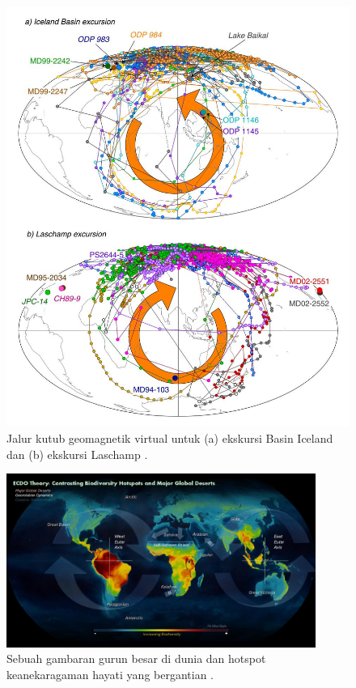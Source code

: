 \documentclass[10pt,twocolumn,letterpaper]{article}
\begin{document}
\begin{figure}[b]
\begin{center}
   \includegraphics[width=0.95\linewidth]{laj.jpg}
\end{center}
   \caption{Jalur kutub geomagnetik virtual untuk (a) ekskursi Basin Iceland dan (b) ekskursi Laschamp \cite{35}.}
\label{fig:7}
\label{fig:onecol}
\end{figure}

\begin{figure}[t]
\begin{center}
\includegraphics[width=0.9\textwidth]{biodiversity.jpg}
\end{center}
   \caption{Sebuah gambaran gurun besar di dunia dan hotspot keanekaragaman hayati yang bergantian \cite{28}.}
\label{fig:9}
\end{figure}
\end{document}
